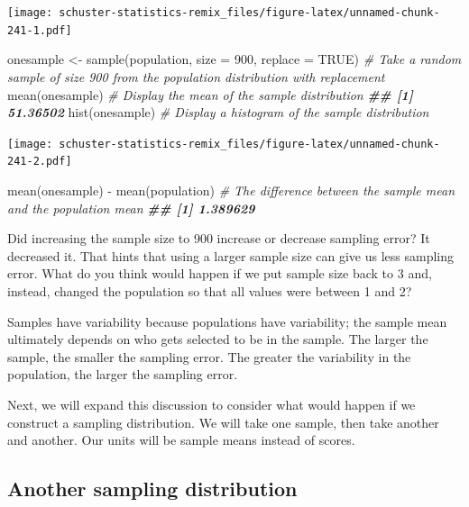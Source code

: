 \documentclass[
]{book}
\newenvironment{Shaded}{\begin{snugshade}}{\end{snugshade}}
\newcommand{\AttributeTok}[1]{\textcolor[rgb]{0.77,0.63,0.00}{#1}}
\newcommand{\CommentTok}[1]{\textcolor[rgb]{0.56,0.35,0.01}{\textit{#1}}}
\newcommand{\ConstantTok}[1]{\textcolor[rgb]{0.00,0.00,0.00}{#1}}
\newcommand{\DecValTok}[1]{\textcolor[rgb]{0.00,0.00,0.81}{#1}}
\newcommand{\DocumentationTok}[1]{\textcolor[rgb]{0.56,0.35,0.01}{\textbf{\textit{#1}}}}
\newcommand{\FunctionTok}[1]{\textcolor[rgb]{0.00,0.00,0.00}{#1}}
\newcommand{\NormalTok}[1]{#1}
\newcommand{\OtherTok}[1]{\textcolor[rgb]{0.56,0.35,0.01}{#1}}
\newcommand{\SpecialCharTok}[1]{\textcolor[rgb]{0.00,0.00,0.00}{#1}}
\begin{document}
\texttt{[image: schuster-statistics-remix\_files/figure-latex/unnamed-chunk-241-1.pdf]}

\begin{Shaded}
\begin{Highlighting}[]
\NormalTok{onesample }\OtherTok{\textless{}{-}} \FunctionTok{sample}\NormalTok{(population, }\AttributeTok{size =} \DecValTok{900}\NormalTok{, }\AttributeTok{replace =} \ConstantTok{TRUE}\NormalTok{) }\CommentTok{\# Take a random sample of size 900 from the population distribution with replacement}
\FunctionTok{mean}\NormalTok{(onesample) }\CommentTok{\# Display the mean of the sample distribution}
\DocumentationTok{\#\# [1] 51.36502}
\FunctionTok{hist}\NormalTok{(onesample) }\CommentTok{\# Display a histogram of the sample distribution}
\end{Highlighting}
\end{Shaded}

\texttt{[image: schuster-statistics-remix\_files/figure-latex/unnamed-chunk-241-2.pdf]}

\begin{Shaded}
\begin{Highlighting}[]
\FunctionTok{mean}\NormalTok{(onesample) }\SpecialCharTok{{-}} \FunctionTok{mean}\NormalTok{(population) }\CommentTok{\# The difference between the sample mean and the population mean}
\DocumentationTok{\#\# [1] 1.389629}
\end{Highlighting}
\end{Shaded}

Did increasing the sample size to 900 increase or decrease sampling error? It decreased it. That hints that using a larger sample size can give us less sampling error. What do you think would happen if we put sample size back to 3 and, instead, changed the population so that all values were between 1 and 2?

Samples have variability because populations have variability; the sample mean ultimately depends on who gets selected to be in the sample. The larger the sample, the smaller the sampling error. The greater the variability in the population, the larger the sampling error.

Next, we will expand this discussion to consider what would happen if we construct a sampling distribution. We will take one sample, then take another and another. Our units will be sample means instead of scores.

\hypertarget{another-sampling-distribution}{%
\subsection{Another sampling distribution}\label{another-sampling-distribution}}
\end{document}
